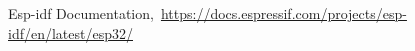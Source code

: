 \cleardoublepage
{}
{}
\begin{thebibliography}{99}


Esp-idf Documentation,\ \url{https://docs.espressif.com/projects/esp-idf/en/latest/esp32/}

\end{thebibliography}
